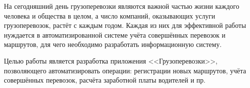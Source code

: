 
На сегодняшний день грузоперевозки являются важной частью жизни
каждого человека и общества в целом, а число компаний, оказывающих
услуги грузоперевозок, растёт с каждым годом. Каждая из них для 
эффективной работы нуждается в автоматизированной системе учёта
совершённых перевозок и маршрутов, для чего необходимо разработать
информационную систему.

Целью работы является разработка приложения <<Грузоперевозки>>,
позволяющего автоматизировать операции: 
регистрации новых маршрутов, 
учёта совершённых перевозок,
расчёта заработной платы водителей
и пр.

